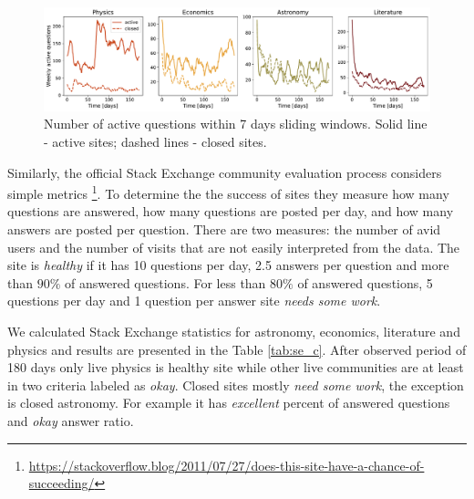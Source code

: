 \begin{figure}
	\centering
	\includegraphics[width=\linewidth]{figures/stackexchange/active_questions.pdf}
	\caption[Number of active questions within 7 days sliding windows]{Number of active questions within 7 days sliding windows. Solid line - active sites; dashed lines - closed sites.}
	\label{fig:active_questions}
\end{figure}

Similarly, the official Stack Exchange community evaluation process considers simple metrics \footnote{\href{https://stackoverflow.blog/2011/07/27/does-this-site-have-a-chance-of-succeeding/}{https://stackoverflow.blog/2011/07/27/does-this-site-have-a-chance-of-succeeding/}}. To determine the the success of sites  they measure how many questions are answered, how many questions are posted per day, and how many answers are posted per question.  There are two measures: the number of avid users and the number of visits that are not easily interpreted from the data. The site is \textit{healthy} if it has 10 questions per day, 2.5 answers per question and more than $90\%$ of answered questions. For less than $80\%$ of answered questions, 5 questions per day and 1 question per answer site \textit{needs some work}. 

We calculated Stack Exchange statistics for astronomy, economics, literature and physics and results are presented in the Table \ref{tab:se_c}. After observed period of 180 days only live physics is healthy site while other live communities are at least in two criteria labeled as \textit{okay}. Closed sites mostly \textit{need some work}, the exception is closed astronomy. For example it has \textit{excellent} percent of answered questions and \textit{okay} answer ratio.  


